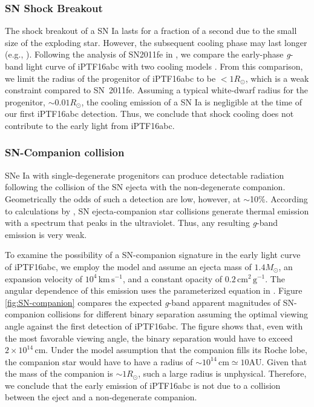 \documentclass[twocolumn]{aastex61}
\newcommand{\sm}{M_\odot}
\newcommand{\sr}{R_\odot}
\begin{document}
\subsubsection{SN Shock Breakout}

The shock breakout of a SN Ia lasts for a fraction of a second due to
the small size of the exploding star. However, the subsequent cooling
phase may last longer (e.g., \citealt{2010ApJ...708..598P}).
Following the analysis of SN2011fe in \citet{2012ApJ...744L..17B}, we
compare the early-phase \textit{g}-band light curve of iPTF16abc with
two cooling models \citep{2011ApJ...728...63R, 2010ApJ...708..598P}. From this comparison, we limit the radius of 
the
progenitor of iPTF16abc to be $<1\sr$, which is a weak constraint compared to SN~2011fe. Assuming a 
typical white-dwarf radius for the progenitor, $\sim{0.01}\sr$, the cooling emission of a
SN Ia is negligible at the time of our first iPTF16abc detection. 
Thus, we conclude that shock cooling does not contribute to the 
early light from iPTF16abc.

\subsubsection{SN-Companion collision}

SNe Ia with single-degenerate progenitors can produce detectable 
radiation following the collision of the SN ejecta with the 
non-degenerate companion. Geometrically the odds of such a 
detection are low, however, at $\sim$10\%. According to 
calculations by
\citet{2010ApJ...708.1025K}, SN ejecta-companion star collisions 
generate thermal emission with a spectrum that peaks in the 
ultraviolet. Thus, any resulting \textit{g}-band emission is very weak.

To examine the possibility of a SN-companion signature in the early
light curve of iPTF16abc, we employ the \citet{2010ApJ...708.1025K}
model and assume an ejecta mass of $1.4\sm$, an expansion velocity of
$10^{4}\,\textrm{km}\,\textrm{s}^{-1}$, and a constant opacity of
$0.2\,\textrm{cm}^2\,\textrm{g}^{-1}$. The angular dependence of this
emission uses the parameterized equation in
\citet{2012ApJ...749...18B}.  Figure \ref{fig:SN-companion} compares
the expected \textit{g}-band apparent magnitudes of SN-companion
collisions for different binary separation assuming the optimal viewing
angle against the first detection of iPTF16abc. The figure shows that,
even with the most favorable viewing angle, the binary separation would
have to exceed $2\times10^{14}\,\textrm{cm}$. Under the model assumption that the
companion fills its Roche lobe, the companion star would have to have
a radius of $\sim10^{14}\,\textrm{cm}\simeq10 \mathrm{AU}$. Given that the
mass of the companion is $\sim1\sr$, such a large radius is unphysical.
Therefore, we conclude that the early emission of iPTF16abc is not 
due to a collision between the eject and a non-degenerate companion.
\end{document}
